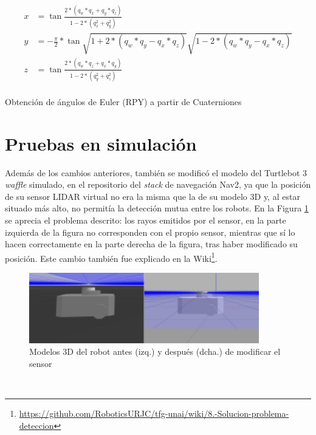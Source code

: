 \begin{myequation}[h!]
  \begin{equation}
  \begin{aligned}
  x &= \tan{\frac{2 * (q_w*q_x + q_y*q_z)}{1 - 2 * (q_x^2 + q_y^2)}}  \\
  y &= -\frac{\pi}{2} * \tan{\sqrt{1 + 2 * (q_w * q_y - q_x * q_z)}}{\sqrt{1 - 2 * (q_w * q_y - q_x * q_z)}}  \\
  z &= \tan{\frac{2 * (q_w * q_z + q_x * q_y)}{1 - 2 * (q_y^2 + q_z^2)}}  \\
  \end{aligned}
  \label{ec:euler_to_quat}
  \end{equation}
  \caption[Obtención de ángulos de Euler (RPY) a partir de Cuaterniones]{Obtención de ángulos de Euler (RPY) a partir de Cuaterniones}
\end{myequation}



\section{Pruebas en simulación}
\label{sec:pruebas_sim}

Además de los cambios anteriores, también se modificó el modelo del Turtlebot 3
\textit{waffle} simulado, en el repositorio del \textit{stack} de navegación
Nav2, ya que la posición de su sensor LIDAR virtual no era la misma que la de su
modelo 3D y, al estar situado más alto, no permitía la detección mutua entre los
robots.
En la Figura \ref{fig:mutua_deteccion} se aprecia el problema descrito: los
rayos emitidos por el sensor, en la parte izquierda de la figura no corresponden
con el propio sensor, mientras que sí lo hacen correctamente en la parte derecha
de la figura, tras haber modificado su posición.
Este cambio también fue explicado en la Wiki\footnote{
\href{https://github.com/RoboticsURJC/tfg-unai/wiki/8.-Soluci\%C3\%B3n-del-problema-de-mutua-detecci\%C3\%B3n-de-los-Turtlebot3-\%5B28-Jun---29-Jul\%5D}{https://github.com/RoboticsURJC/tfg-unai/wiki/8.-Solucion-problema-deteccion}}.

\begin{figure} [h!]
  \begin{center}
    \includegraphics[width=10cm]{figs/turtlebot_model_mods}
  \end{center}
  \caption{Modelos 3D del robot antes (izq.) y después (dcha.) de modificar el sensor}
  \label{fig:mutua_deteccion}
\end{figure}\

